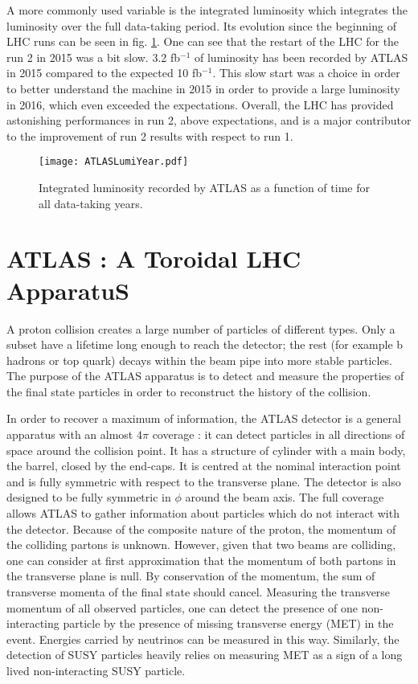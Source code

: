 A more commonly used variable is the integrated luminosity which integrates the luminosity over the full data-taking period.
Its evolution since the beginning of LHC runs can be seen in fig. \ref{fig:orgb783d32}.
One can see that the restart of the LHC for the run 2 in 2015 was a bit slow.
3.2 fb$^{-1}$ of luminosity has been recorded by ATLAS in 2015 compared to the expected 10 fb$^{-1}$.
This slow start was a choice in order to better understand the machine in 2015 in order to provide a large luminosity in 2016, which even exceeded the expectations.
Overall, the LHC has provided astonishing performances in run 2, above expectations, and is a major contributor to the improvement of run 2 results with respect to run 1.

\begin{figure}[htbp]
\centering
\texttt{[image: ATLASLumiYear.pdf]}
\caption{\label{fig:orgb783d32}
Integrated luminosity recorded by ATLAS as a function of time for all data-taking years.\cite{ATLASPublicLumiRun2}}
\end{figure}



\chapter{ATLAS : A Toroidal LHC ApparatuS}
\label{sec:org6b364c7}

A proton collision creates a large number of particles of different types.
Only a subset have a lifetime long enough to reach the detector; the rest (for example b hadrons or top quark) decays within the beam pipe into more stable particles.
The purpose of the ATLAS apparatus is to detect and measure the properties of the final state particles in order to reconstruct the history of the collision.

In order to recover a maximum of information, the ATLAS detector is a general apparatus with an almost $4\pi$ coverage : it can detect particles in all directions of space around the collision point.
It has a structure of cylinder with a main body, the barrel, closed by the end-caps.
It is centred at the nominal interaction point and is fully symmetric with respect to the transverse plane.
The detector is also designed to be fully symmetric in $\phi$ around the beam axis.
The full coverage allows ATLAS to gather information about particles which do not interact with the detector.
Because of the composite nature of the proton, the momentum of the colliding partons is unknown.
However, given that two beams are colliding, one can consider at first approximation that the momentum of both partons in the transverse plane is null.
By conservation of the momentum, the sum of transverse momenta of the final state should cancel.
Measuring the transverse momentum of all observed particles, one can detect the presence of one non-interacting particle by the presence of missing transverse energy (MET) in the event.
Energies carried by neutrinos can be measured in this way.
Similarly, the detection of SUSY particles heavily relies on measuring MET as a sign of a long lived non-interacting SUSY particle.

